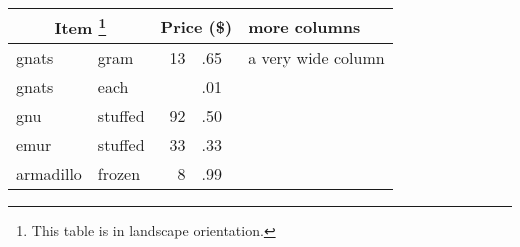 \begin{tabular}{llr@{}ll}
\hline
\multicolumn{2}{c}{{\small Item%
\footnote{%
This table is in landscape orientation.
   }
}}
& \multicolumn{2}{c}{{\small Price (\$)}}& more columns\\
\hline
gnats     & gram    & 13&.65 & a very wide column\\
gnats     & each    &   &.01 &\\
gnu       & stuffed & 92&.50 &\\
emur      & stuffed & 33&.33 &\\
armadillo & frozen  &  8&.99 &\\
\hline
\end{tabular}

